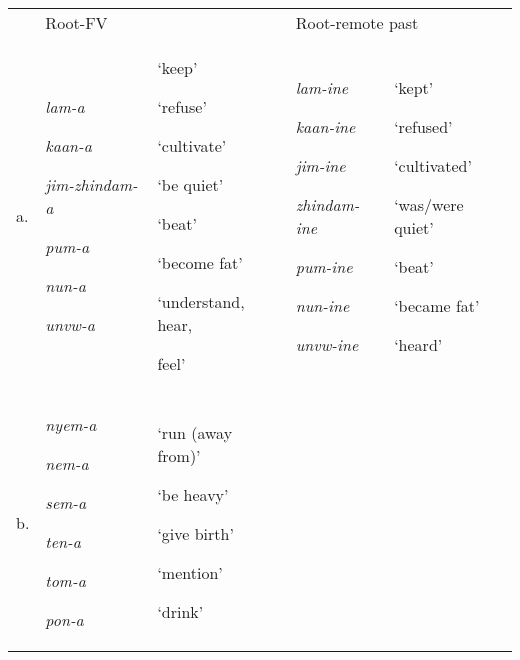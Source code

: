 \documentclass[output=paper]{langsci/langscibook}
\begin{document}
\begin{tabular}{lllll} & \multicolumn{2}{l}{\mdseries Root-FV} & \multicolumn{2}{l}{\mdseries Root-remote past}\\
\lsptoprule
\mdseries a. & {\mdseries \emph{lam-a}}

{\mdseries \emph{kaan-a}}

{\mdseries \emph{jim-zhindam-a}}

{\mdseries \emph{pum-a}}

{\mdseries \emph{nun-a}}

\mdseries \emph{unvw-a} & {\mdseries ‘keep’}

{\mdseries ‘refuse’}

{\mdseries ‘cultivate’}

{\mdseries ‘be quiet’}

{\mdseries ‘beat’}

{\mdseries ‘become fat’}

{\mdseries ‘understand, hear,}

\mdseries feel’ & {\mdseries \emph{lam-ine}}

{\mdseries \emph{kaan-ine}}

{\mdseries \emph{jim-ine}}

{\mdseries \emph{zhindam-ine}}

{\mdseries \emph{pum-ine}}

{\mdseries \emph{nun-ine}}

\mdseries \emph{unvw-ine} & {\mdseries ‘kept’}

{\mdseries ‘refused’}

{\mdseries ‘cultivated’}

{\mdseries ‘was/were quiet’}

{\mdseries ‘beat’}

{\mdseries ‘became fat’}

\mdseries ‘heard’\\
\mdseries b. & {\mdseries \emph{nyem-a }}

{\mdseries \emph{nem-a }}

{\mdseries \emph{sem-a}}

{\mdseries \emph{ten-a}}

{\mdseries \emph{tom-a}}

\mdseries \emph{pon-a} & {\mdseries ‘run (away from)’}

{\mdseries ‘be heavy’}

{\mdseries ‘give birth’}

{\mdseries ‘mention’}

{\mdseries ‘drink’}


\end{tabular}
\end{document}

